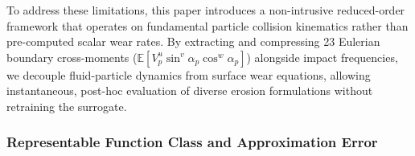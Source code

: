 \documentclass{article}
\begin{document}
To address these limitations, this paper introduces a non-intrusive reduced-order framework that operates on fundamental particle collision kinematics rather than pre-computed scalar wear rates. By extracting and compressing 23 Eulerian boundary cross-moments ($\mathbb{E}[V_p^u \sin^v\alpha_p \cos^w\alpha_p]$) alongside impact frequencies, we decouple fluid-particle dynamics from surface wear equations, allowing instantaneous, post-hoc evaluation of diverse erosion formulations without retraining the surrogate.

\subsubsection*{Representable Function Class and Approximation Error}

\begin{table}[htpb]
\centering
\caption{Classification of erosion formulations and their representability within the selected 23-moment kinematic basis.}
\label{tab:representability}
\small
{}
\end{table}
\end{document}
